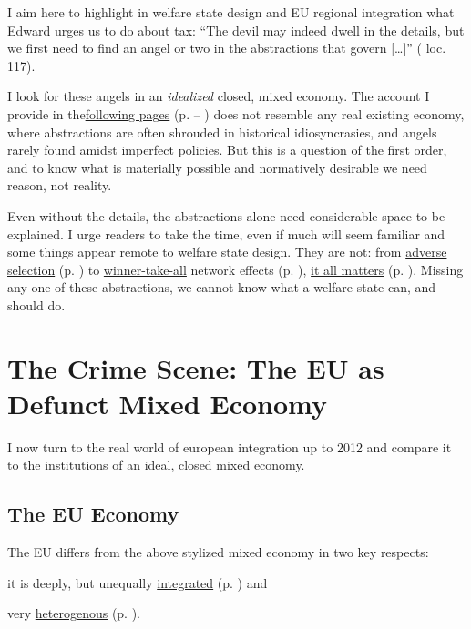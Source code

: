 \documentclass[11pt,a4paper,oneside,openright]{article}
\begin{document}
I aim here to highlight in welfare state design and \gls{EU} regional integration what Edward \citeauthor{McCaffery2002} urges us to do about tax: 
``The devil may indeed dwell in the details, but we first need to find an angel or two in the abstractions that govern [\ldots]'' (\citeyear{McCaffery2002} loc. 117). 

I look for these angels in an \emph{idealized} closed, mixed economy. 
The account I provide in the\hyperref[sec:mixed-economy]{following pages} (p. \pageref{sec:mixed-economy} -- \pageref{sec:EU-reality}) does not resemble any real existing economy, where abstractions are often shrouded in historical idiosyncrasies, and angels rarely found amidst imperfect policies. 
But this is a question of the first order, and to know what is materially possible and normatively desirable we need reason, not reality.

Even without the details, the abstractions alone need considerable space to be explained. 
I urge readers to take the time, even if much will seem familiar and some things appear remote to welfare state design. 
They are not: 
from \hyperref[sec:adverse-selection]{adverse selection} (p. \pageref{sec:adverse-selection}) to \hyperref[sec:winner-take-all]{winner-take-all} network effects (p. \pageref{sec:winner-take-all}), \hyperref[sec:why-mixed-economy-matters]{it all matters} (p. \pageref{sec:why-mixed-economy-matters}). 
Missing any one of these abstractions, we cannot know what a welfare state can, and should do.


\section{The Crime Scene: The EU as Defunct Mixed Economy} \label{sec:EU-reality}
I now turn to the real world of european integration up to 2012 and compare it to the institutions of an ideal, closed mixed economy.
	
	\subsection{The EU Economy}
The \gls{EU} differs from the above stylized mixed economy in two key respects:
\begin{inparaenum}[1)] 
	\item it is deeply, but unequally \hyperref[sec:EU-Acquis]{integrated} (p. \pageref{sec:EU-Acquis}) and 
	\item very \hyperref[sec:sources-of-wealth]{heterogenous} (p. \pageref{sec:sources-of-wealth}).
\end{inparaenum}
\end{document}
